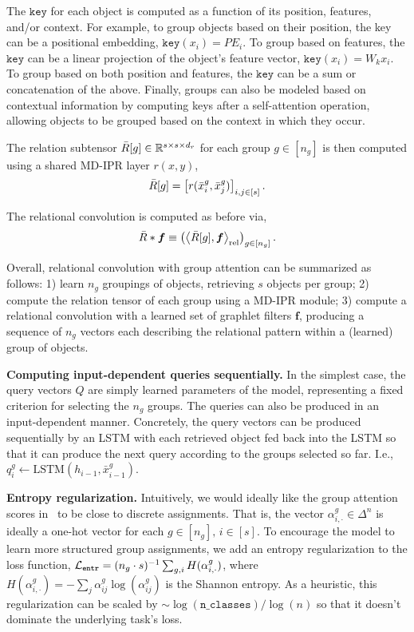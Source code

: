 The $\mathtt{key}$ for each object is computed as a function of its position, features, and/or context. For example, to group objects based on their position, the key can be a positional embedding, $\mathtt{key}(x_i) = PE_i$. To group based on features, the $\mathtt{key}$ can be a linear projection of the object's feature vector, $\mathtt{key}(x_i) = W_k x_i$. To group based on both position and features, the $\mathtt{key}$ can be a sum or concatenation of the above. Finally, groups can also be modeled based on contextual information by computing keys after a self-attention operation, allowing objects to be grouped based on the context in which they occur.

The relation subtensor $\bar{R}[g] \in \mathbb{R}^{s \times s \times d_r}$ for each group $g \in [n_g]$ is then computed using a shared MD-IPR layer $r(x, y)$,
\begin{equation}\label{eq:group_attn_relsubtensor}
    \bar{R}[g] = \left[r(\bar{x}_{i}^{g}, \bar{x}_{j}^{g})\right]_{i,j \in [s]}.
\end{equation}


The relational convolution is computed as before via,
\begin{equation}\label{eq:relconv_groupattn}
    \bar{R} \ast \bm{f} \equiv \left(\left\langle \bar{R}[g], \bm{f} \right\rangle_\mathrm{rel}\right)_{g \in [n_g]}.
\end{equation}

Overall, relational convolution with group attention can be summarized as follows: 1) learn $n_g$ groupings of objects, retrieving $s$ objects per group; 2) compute the relation tensor of each group using a MD-IPR module; 3) compute a relational convolution with a learned set of graphlet filters $\bm{f}$, producing a sequence of $n_g$ vectors each describing the relational pattern within a (learned) group of objects.

\textbf{Computing input-dependent queries sequentially.} In the simplest case, the query vectors $Q$ are simply learned parameters of the model, representing a fixed criterion for selecting the $n_g$ groups. The queries can also be produced in an input-dependent manner. Concretely, the query vectors can be produced sequentially by an LSTM with each retrieved object fed back into the LSTM so that it can produce the next query according to the groups selected so far. I.e., $q_i^g \gets \mathrm{LSTM}(h_{i-1}, \bar{x}_{i-1}^g)$.

\textbf{Entropy regularization.} Intuitively, we would ideally like the group attention scores in~ to be close to discrete assignments. That is, the vector $\alpha_{i,\cdot}^{g} \in \Delta^{n}$ is ideally a one-hot vector for each $g \in [n_g],\, i \in [s]$. To encourage the model to learn more structured group assignments, we add an entropy regularization to the loss function, ${\mathcal{L}}_{\mathtt{entr}} = (n_g \cdot s)^{-1} \sum_{g, i} H(\alpha_{i,\cdot}^{g})$, where $H(\alpha_{i,\cdot}^{g}) = - \sum_{j} \alpha_{ij}^{g} \log(\alpha_{ij}^g)$ is the Shannon entropy. As a heuristic, this regularization can be scaled by $\sim \log(\mathtt{n\_classes}) / \log(n)$ so that it doesn't dominate the underlying task's loss.

